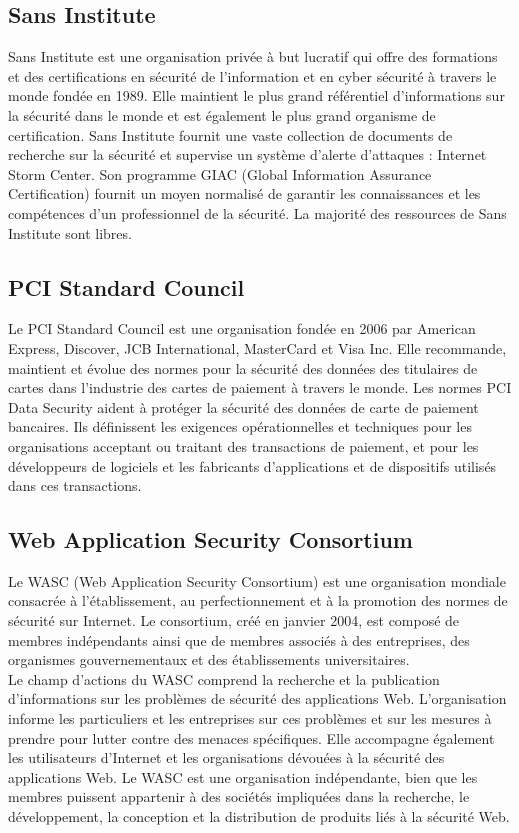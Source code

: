 \subsection{Sans Institute}
Sans Institute est une organisation privée à but lucratif qui offre des formations et des certifications en sécurité de l'information et en cyber sécurité à travers le monde fondée en 1989. Elle maintient le plus grand référentiel d'informations sur la sécurité dans le monde et est également le plus grand organisme de certification. Sans Institute fournit une vaste collection de documents de recherche sur la sécurité et supervise un système d’alerte d’attaques : Internet Storm Center. Son programme GIAC (Global Information Assurance Certification) fournit un moyen normalisé de garantir les connaissances et les compétences d'un professionnel de la sécurité. La majorité des ressources de Sans Institute sont libres.\\

\subsection{PCI Standard Council}
Le PCI Standard Council est une organisation fondée en 2006 par American Express, Discover, JCB International, MasterCard et Visa Inc. Elle recommande, maintient et évolue des normes pour la sécurité des données des titulaires de cartes dans l'industrie des cartes de paiement à travers le monde. Les normes PCI Data Security aident à protéger la sécurité des données de carte de paiement bancaires. Ils définissent les exigences opérationnelles et techniques pour les organisations acceptant ou traitant des transactions de paiement, et pour les développeurs de logiciels et les fabricants d'applications et de dispositifs utilisés dans ces transactions.

\subsection{Web Application Security Consortium}
Le WASC (Web Application Security Consortium) est une organisation mondiale consacrée à l'établissement, au perfectionnement et à la promotion des normes de sécurité sur Internet. Le consortium, créé en janvier 2004, est composé de membres indépendants ainsi que de membres associés à des entreprises, des organismes gouvernementaux et des établissements universitaires.\\
Le champ d'actions du WASC comprend la recherche et la publication d'informations sur les problèmes de sécurité des applications Web. L’organisation informe les particuliers et les entreprises sur ces problèmes et sur les mesures à prendre pour lutter contre des menaces spécifiques. Elle accompagne également les utilisateurs d’Internet et les organisations dévouées à la sécurité des applications Web. Le WASC est une organisation indépendante, bien que les membres puissent appartenir à des sociétés impliquées dans la recherche, le développement, la conception et la distribution de produits liés à la sécurité Web.\\

